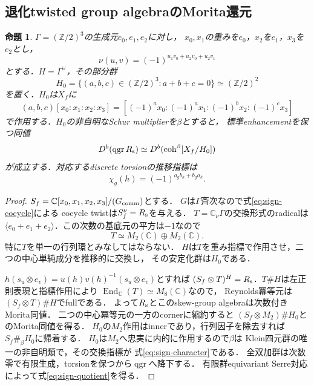 \documentclass[11pt,a4paper]{ltjsarticle}
\newtheorem{proposition}[theorem]{命題}
\theoremstyle{definition}
\newcommand{\qgr}{\operatorname{qgr}}
\newcommand{\coh}{\operatorname{coh}}
\begin{document}
\subsection{退化twisted group algebraのMorita還元}
\begin{proposition}\label{prop:sign-Morita}
$\Gamma=(\mathbb Z/2)^3$の生成元$e_0,e_1,e_2$に対し，
$x_0,x_1$の重みを$e_0$，$x_2$を$e_1$，$x_3$を$e_2$とし，
\begin{equation}\label{eq:sign-cocycle}
 \nu(u,v)=(-1)^{u_1v_0+u_2v_0+u_2v_1}
\end{equation}
とする．$H=\Gamma^\vee$，その部分群
\[
 H_0=\{(a,b,c)\in(\mathbb Z/2)^3:a+b+c=0\}
 \simeq(\mathbb Z/2)^2
\]
を置く．$H_0$は$X_f$に
\begin{equation}\label{eq:sign-H-action}
 (a,b,c)[x_0:x_1:x_2:x_3]
 =[(-1)^a x_0:(-1)^a x_1:(-1)^b x_2:(-1)^c x_3]
\end{equation}
で作用する．$H_0$の非自明なSchur multiplierを$\beta$とすると，
標準enhancementを保つ同値
\begin{equation}\label{eq:sign-quotient}
 D^b(\qgr R_{\rm s})\simeq D^b(\coh^\beta[X_f/H_0])
\end{equation}
が成立する．対応するdiscrete torsionの推移指標は
\begin{equation}\label{eq:sign-character}
 \chi_g(h)=(-1)^{a_g b_h+b_g a_h}.
\end{equation}
\end{proposition}
\begin{proof}
$S_f=\mathbb C[x_0,x_1,x_2,x_3]/(G_{\rm comm})$とする．
$G$は$\Gamma$斉次なので式\eqref{eq:sign-cocycle}による
cocycle twistは$S_f^\nu=R_{\rm s}$を与える．
$T=\mathbb C_\nu\Gamma$の交換形式のradicalは
$\langle e_0+e_1+e_2\rangle$．この次数の基底元の平方は$-1$なので
\[
 T\simeq M_2(\mathbb C)\oplus M_2(\mathbb C).
\]
特に$T$を単一の行列環とみなしてはならない．
$H$は$T$を重み指標で作用させ，二つの中心単純成分を推移的に交換し，
その安定化群は$H_0$である．

$h(s_u\otimes e_v)=u(h)v(h)^{-1}(s_u\otimes e_v)$とすれば
$(S_f\otimes T)^H=R_{\rm s}$．$T\#H$は左正則表現と指標作用により
$\operatorname{End}_{\mathbb C}(T)\simeq M_8(\mathbb C)$なので，
Reynolds冪等元は$(S_f\otimes T)\#H$でfullである．
よって$R_{\rm s}$とこのskew-group algebraは次数付きMorita同値．
二つの中心冪等元の一方のcornerに縮約すると
$(S_f\otimes M_2)\#H_0$とのMorita同値を得る．
$H_0$の$M_2$作用はinnerであり，行列因子を除去すれば
$S_f\#_\beta H_0$に帰着する．
$H_0$は$M_2$へ忠実に内的に作用するので$\beta$は
Klein四元群の唯一の非自明類で，その交換指標が
式\eqref{eq:sign-character}である．
全双加群は次数零で有限生成，torsionを保つから$\qgr$へ降下する．
有限群equivariant Serre対応によって式\eqref{eq:sign-quotient}を得る．
\end{proof}
\end{document}
